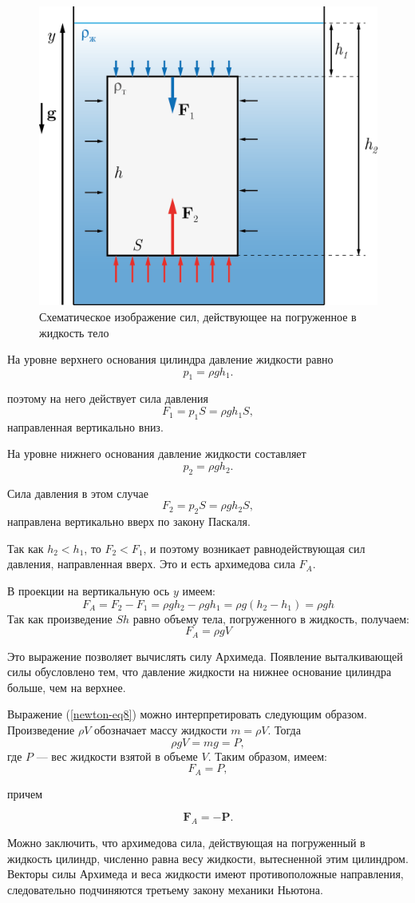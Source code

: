 \documentclass[14pt,a4paper,oneside]{extarticle}	%
\begin{document}
\begin{figure}[H] 
	\centering 	
	\includegraphics[width=0.5\linewidth]{newton-4.png}
	\caption{Схематическое изображение сил, действующее на погруженное в жидкость тело}
	\label{newton-4}
\end{figure}

На уровне верхнего основания цилиндра давление жидкости равно $$ p_{1} = \rho gh_{1}. $$

поэтому на него действует сила давления $$ F_{1} = p_{1}S = \rho gh_{1}S, $$
направленная вертикально вниз.

На уровне нижнего основания давление жидкости составляет $$p_{2} = \rho gh_{2}.$$

Сила давления в этом случае $$ F_{2} = p_{2}S = \rho gh_{2}S, $$ 
направлена вертикально вверх по закону Паскаля.

Так как $ h_{2} < h_{1} $, то $ F_{2} < F_{1} $, и поэтому возникает равнодействующая сил давления, направленная вверх. 
Это и есть архимедова сила $ F_{A} $. 

В проекции на вертикальную ось $ y $ имеем:
\begin{equation}\label{newton-eq7}
F_{A} = F_{2} - F_{1} = \rho gh_{2} - \rho gh_{1} = \rho g(h_{2} - h_{1}) = \rho gh
\end{equation} 
Так как произведение $ Sh $ равно объему тела, погруженного в жидкость, получаем: 
\begin{equation}\label{newton-eq8}
F_{A} = \rho gV
\end{equation} 

Это выражение позволяет вычислять силу Архимеда.
Появление выталкивающей силы обусловлено тем, что давление жидкости на нижнее основание цилиндра больше, чем на верхнее.

Выражение (\ref{newton-eq8}) можно интерпретировать следующим образом. 
Произведение $ \rho V $ обозначает массу жидкости  $ m = \rho V $. 
Тогда $$\rho g V = mg = P,$$
где $ P $ — вес жидкости взятой в объеме $ V $. 
Таким образом, имеем:
\begin{equation}\label{newton-eq9}
F_{A} = P,
\end{equation} 

причем 

\begin{equation}\label{newton-eq10}
\textbf{F}_{A} = -\textbf{P}.
\end{equation} 

Можно заключить, что архимедова сила, действующая на погруженный в жидкость цилиндр, численно равна весу жидкости, вытесненной этим цилиндром.
Векторы силы Архимеда и веса жидкости имеют противоположные направления, следовательно подчиняются третьему закону механики Ньютона.
\end{document}
